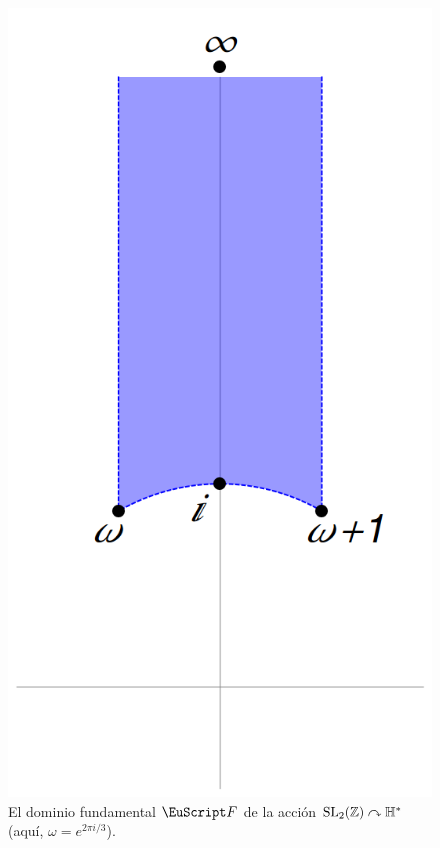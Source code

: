 \documentclass[../../tesis_maestria]{subfiles}
\begin{document}
\begin{figure}[h]%
  \centering
  \includegraphics[scale=0.25]{figuras/dominiofundamental}
  \caption{El dominio fundamental $\Ff$ de la acci\'on $\mathrm{SL}_2(\mathbb{Z})\curvearrowright\mathbb{H}^*$ (aqu\'i,
    $\omega=e^{2\pi i/3}$).}
  \label{fig:dominiofundamental}
\end{figure}%
\end{document}

